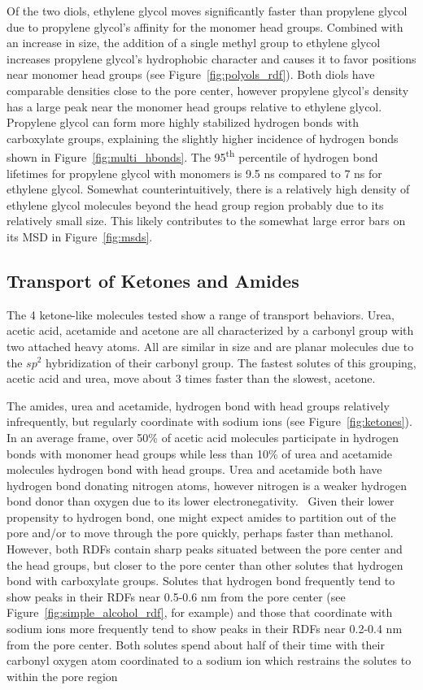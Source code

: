 \documentclass[journal=jpcbfk,manuscript=article]{achemso}
\begin{document}
  Of the two diols, ethylene glycol moves significantly faster than propylene
  glycol due to propylene glycol's affinity for the monomer head groups.
  Combined with an increase in size, the addition of a single methyl group to
  ethylene glycol increases propylene glycol's hydrophobic character and causes
  it to favor positions near monomer head groups (see Figure~\ref{fig:polyols_rdf}).
  Both diols have comparable densities close to the pore center, however propylene
  glycol's density has a large peak near the monomer head groups relative to 
  ethylene glycol. Propylene glycol can form more highly stabilized hydrogen 
  bonds with carboxylate groups, explaining the slightly higher incidence of 
  hydrogen bonds shown in Figure~\ref{fig:multi_hbonds}. The 95\textsuperscript{th}
  percentile of hydrogen bond lifetimes for propylene glycol with monomers is 
  9.5 ns compared to 7 ns for ethylene glycol. Somewhat counterintuitively, there is a 
  relatively high density of ethylene glycol molecules beyond the head group region
  probably due to its relatively small size. This likely contributes to the somewhat
  large error bars on its MSD in Figure~\ref{fig:msds}. 

  \subsection{Transport of Ketones and Amides}
  
  The 4 ketone-like molecules tested show a range of transport behaviors. 
  Urea, acetic acid, acetamide and acetone are all characterized by
  a carbonyl group with two attached heavy atoms. All are similar in size and
  are planar molecules due to the $sp^2$ hybridization of their carbonyl group. 
  The fastest solutes of this grouping, acetic acid and urea, move about 3
  times faster than the slowest, acetone.
  
  The amides, urea and acetamide, hydrogen bond with head groups relatively 
  infrequently, but regularly coordinate with sodium ions (see 
  Figure~\ref{fig:ketones}). In an average frame, over 50\% of acetic acid molecules
  participate in hydrogen bonds with monomer head groups while less than 
  10\% of urea and acetamide molecules hydrogen bond with head groups. 
  Urea and acetamide both have hydrogen bond donating nitrogen atoms, however
  nitrogen is a weaker hydrogen bond donor than oxygen due to its lower 
  electronegativity.~\cite{biswal_hydrogen_2015} Given their lower propensity
  to hydrogen bond, one might expect amides to partition out of the pore 
  and/or to move through the pore quickly, perhaps faster than methanol. 
  However, both RDFs contain sharp peaks situated between the pore center
  and the head groups, but closer to the pore center than other solutes 
  that hydrogen bond with carboxylate groups. Solutes that
  hydrogen bond frequently tend to show peaks in their RDFs near 0.5-0.6 nm 
  from the pore center (see Figure~\ref{fig:simple_alcohol_rdf}, for example)
  and those that coordinate with sodium ions more frequently tend to show 
  peaks in their RDFs near 0.2-0.4 nm from the pore center. Both solutes spend
  about half of their time with their carbonyl oxygen atom coordinated to a
  sodium ion which restrains the solutes to within the pore region
  
\end{document}
